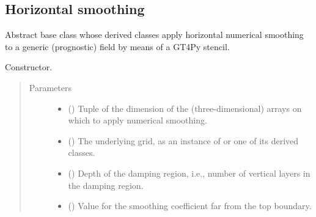 \documentclass[letterpaper,10pt,english]{sphinxmanual}
\begin{document}
\subsection{Horizontal smoothing}
\label{\detokenize{api:horizontal-smoothing}}

\begin{fulllineitems}
\label{\detokenize{api:dycore.horizontal_smoothing.HorizontalSmoothing}}
Abstract base class whose derived classes apply horizontal numerical smoothing to a generic (prognostic)
field by means of a GT4Py stencil.

\begin{fulllineitems}
\label{\detokenize{api:dycore.horizontal_smoothing.HorizontalSmoothing.__init__}}
Constructor.
\begin{quote}\begin{description}
\item[{Parameters}] \leavevmode\begin{itemize}
\item {} 
 () \textendash{} Tuple of the dimension of the (three-dimensional) arrays on which to apply numerical smoothing.

\item {} 
 () \textendash{} The underlying grid, as an instance of {\hyperref[\detokenize{api:grids.grid_xyz.GridXYZ}]{}} or one of its derived classes.

\item {} 
 () \textendash{} Depth of the damping region, i.e., number of vertical layers in the damping region.

\item {} 
 () \textendash{} Value for the smoothing coefficient far from the top boundary.


\end{itemize}
\end{description}
\end{quote}
\end{fulllineitems}
\end{fulllineitems}
\end{document}
